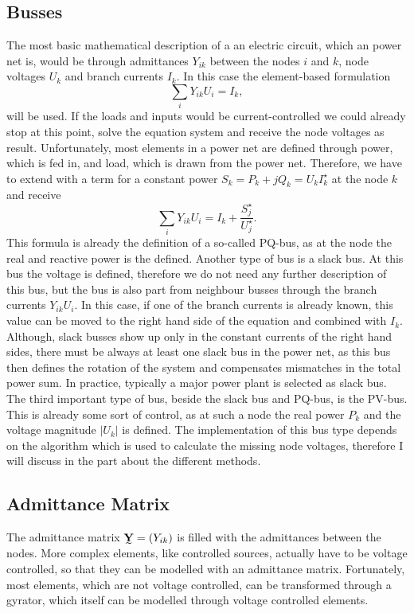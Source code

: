 \subsection{Busses}
The most basic mathematical description of a an electric circuit, which an power net is, would be through admittances $Y_{ik}$ between the nodes $i$ and $k$, node voltages $U_k$ and branch currents $I_k$. In this case the element-based formulation
\begin{equation}
	\sum_i Y_{ik} U_i = I_k,
	\label{eq:current_controlled}
\end{equation}
will be used. If the loads and inputs would be current-controlled we could already stop at this point, solve the equation system and receive the node voltages as result. Unfortunately, most elements in a power net are defined through power, which is fed in, and load, which is drawn from the power net. Therefore, we have to extend  with a term for a constant power $S_k = P_k + j Q_k = U_k I_k^\star$ at the node $k$ and receive
\begin{equation}
	\sum_i Y_{ik} U_i = I_k + \frac{S_j^\star}{U_j^\star}.
	\label{eq:pq_bus}
\end{equation}
This formula is already the definition of a so-called PQ-bus, as at the node the real and reactive power is the defined.
Another type of bus is a slack bus. At this bus the voltage is defined, therefore we do not need any further description of this bus, but the bus is also part from neighbour busses through the branch currents $Y_{ik} U_i$. In this case, if one of the branch currents is already known, this value can be moved to the right hand side of the equation  and combined with $I_k$. Although, slack busses show up only in the constant currents of the right hand sides, there must be always at least one slack bus in the power net, as this bus then defines the rotation of the system and compensates mismatches in the total power sum. In practice, typically a major power plant is selected as slack bus.
The third important type of bus, beside the slack bus and PQ-bus, is the PV-bus. This is already some sort of control, as at such a node the real power $P_k$ and the voltage magnitude $|U_k|$ is defined. The implementation of this bus type depends on the algorithm which is used to calculate the missing node voltages, therefore I will discuss in the part about the different methods.

\subsection{Admittance Matrix}
The admittance matrix $\mat Y = (Y_{ik})$ is filled with the admittances between the nodes. More complex elements, like controlled sources, actually have to be voltage controlled, so that they can be modelled with an admittance matrix. Fortunately, most elements, which are not voltage controlled, can be transformed through a gyrator, which itself can be modelled through voltage controlled elements.

